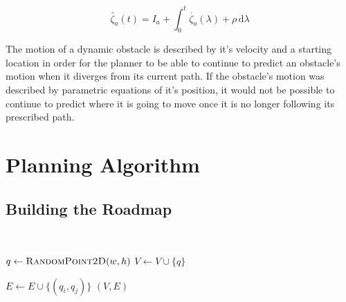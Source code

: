 \begin{equation}
    \tilde{\zeta_a}(t) = I_a + \int_{0}^{t} \dot{\zeta_a}(\lambda)
    + \rho \, \mathrm{d}\lambda
    \label{eq:obs_observed}
\end{equation}

The motion of a dynamic obstacle is described by it's velocity and a starting
location in order for the planner to be able to continue to predict an
obstacle's motion when it diverges from its current path. If the obstacle's
motion was described by parametric equations of it's position, it would not be
possible to continue to predict where it is going to move once it is no longer
following its prescribed path.

\section{Planning Algorithm}

\label{sec:design_planner}

\subsection{Building the Roadmap}

\begin{algorithm}[ht]
    \caption{$\Function{Roadmap}(n, d, w, h, O)$}
    \\
    \label{algo:prm}
    \begin{algorithmic}[1]
        \setcounter{ALC@line}{0}
        \vspace*{1mm}

            \STATE $q \leftarrow \Function{RandomPoint2D}(w, h)$
                \STATE $V \leftarrow V \cup \{q\}$
            \ENDIF
        \ENDFOR

                    \STATE $E \leftarrow E \cup \{(q_i, q_j)\}$
                \ENDIF
            \ENDFOR
        \ENDFOR
        \RETURN $(V,E)$
    \end{algorithmic}
\end{algorithm}

